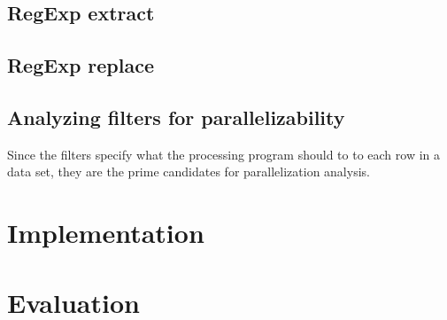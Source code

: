 \subsection{RegExp extract}

\subsection{RegExp replace}


\subsection{Analyzing filters for parallelizability}
Since the filters specify what the processing program should to to each row in a data set, they are the prime candidates for parallelization analysis.

\section{Implementation}

\section{Evaluation}
